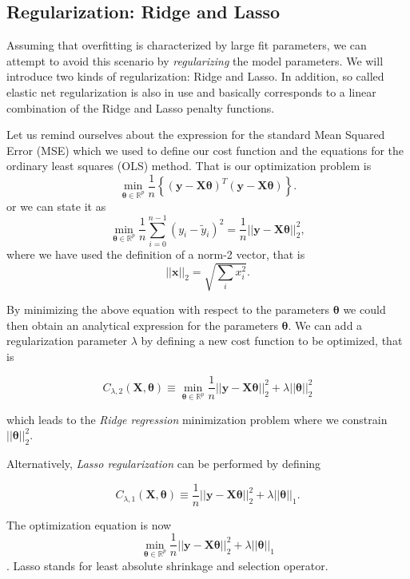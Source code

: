 \documentclass[%
oneside,                 %
final,                   %
10pt]{article}
\begin{document}
\noindent

\subsection{Regularization: Ridge and Lasso}

Assuming that overfitting is characterized by large fit parameters, we can attempt to avoid this scenario by \emph{regularizing} the model parameters. We will introduce two kinds of regularization: Ridge and Lasso. In addition, so called elastic net regularization is also in use and basically corresponds to a linear combination of the Ridge and Lasso penalty functions.

Let us remind ourselves about the expression for the standard Mean Squared Error (MSE) which we used to define our cost function and the equations for the ordinary least squares (OLS) method. That is our optimization problem is
\[
{\displaystyle \min_{\bm{\theta}\in {\mathbb{R}}^{p}}}\frac{1}{n}\left\{\left(\bm{y}-\bm{X}\bm{	\theta}\right)^T\left(\bm{y}-\bm{X}\bm{\theta}\right)\right\}.
\]
or we can state it as
\[
{\displaystyle \min_{\bm{\theta}\in
{\mathbb{R}}^{p}}}\frac{1}{n}\sum_{i=0}^{n-1}\left(y_i-\tilde{y}_i\right)^2=\frac{1}{n}\vert\vert \bm{y}-\bm{X}\bm{\theta}\vert\vert_2^2,
\]
where we have used the definition of  a norm-2 vector, that is
\[
\vert\vert \bm{x}\vert\vert_2 = \sqrt{\sum_i x_i^2}. 
\]

By minimizing the above equation with respect to the parameters
$\bm{\theta}$ we could then obtain an analytical expression for the
parameters $\bm{\theta}$.  We can add a regularization parameter $\lambda$ by
defining a new cost function to be optimized, that is

\[
C_{\lambda,2} \left( \bm{X}, \bm{\theta} \right) \equiv
{\displaystyle \min_{\bm{\theta}\in
{\mathbb{R}}^{p}}}\frac{1}{n}\vert\vert \bm{y}-\bm{X}\bm{\theta}\vert\vert_2^2+\lambda\vert\vert \bm{\theta}\vert\vert_2^2 
\]

which leads to the \emph{Ridge regression} minimization problem where we
constrain $\vert\vert \bm{\theta}\vert\vert_2^2$. 

Alternatively, \emph{Lasso regularization} can be performed by defining

\[
C_{\lambda,1} \left( \bm{X},\bm{\theta} \right) \equiv
\frac{1}{n}\vert\vert \bm{y}-\bm{X}\bm{\theta}\vert\vert_2^2+\lambda\vert\vert \bm{\theta}\vert\vert_1.
\]

The optimization equation is now
\[
{\displaystyle \min_{\bm{\theta}\in
{\mathbb{R}}^{p}}}\frac{1}{n}\vert\vert \bm{y}-\bm{X}\bm{\theta}\vert\vert_2^2+\lambda\vert\vert \bm{\theta}\vert\vert_1
\].
Lasso stands for least absolute shrinkage and selection operator. 
\end{document}
